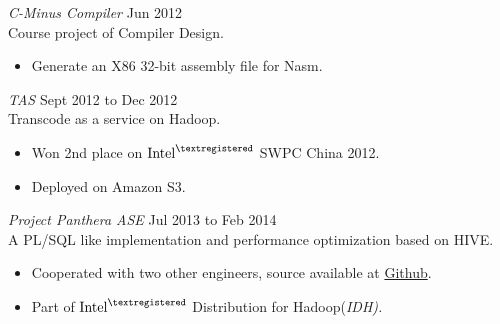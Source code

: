 \documentclass[line,margin]{res}
\begin{document}
\begin{resume}



                {\sl C-Minus Compiler} \hfill        Jun 2012 \\
                Course project of Compiler Design.
                \begin{itemize}
                   \item Generate an X86 32-bit assembly file for Nasm.
                   \end{itemize}
                
                {\sl TAS} \hfill        Sept 2012 to Dec 2012\\
                Transcode as a service on Hadoop.
                  \begin{itemize}
                   \item Won 2nd place on $\textrm{Intel}^{\textregistered}$ SWPC China 2012.
                   \item Deployed on Amazon S3.
                   \end{itemize}
                   
                {\sl Project Panthera ASE} \hfill        Jul 2013 to Feb 2014\\
                A PL/SQL like implementation and performance optimization based on HIVE.
                  \begin{itemize}
                   \item Cooperated with two other engineers, source available at \href{https://github.com/intel-hadoop/project-panthera}{Github}.
                   \item Part of $\textrm{Intel}^{\textregistered}$ Distribution for Hadoop(\sl IDH).
                   \end{itemize}


\end{resume}
\end{document}
